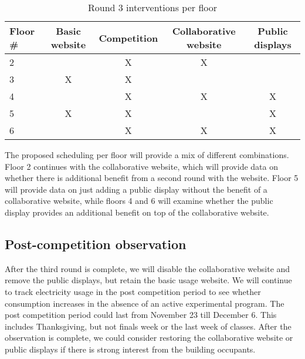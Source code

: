 \documentclass[11pt]{article}
\begin{document}
\begin{table}[htbp]
	\centering
		\begin{tabular}{| l || c | c | c | c |}
			\hline
			Floor \# & Basic website & Competition & Collaborative website & Public displays \tabularnewline \hline \hline
			
			2 &   & X & X & \tabularnewline \hline
			
			3 & X & X &  & \tabularnewline \hline

			4 &   & X & X & X \tabularnewline \hline

			5 & X & X &  & X \tabularnewline \hline
			
			6 &   & X & X & X \tabularnewline \hline
		\end{tabular}
	\caption{Round 3 interventions per floor}
	\label{tab:round3-per-floor}
\end{table}

The proposed scheduling per floor will provide a mix of different combinations. Floor 2 continues with the collaborative website, which will provide data on whether there is additional benefit from a second round with the website. Floor 5 will provide data on just adding a public display without the benefit of a collaborative website, while floors 4 and 6 will examine whether the public display provides an additional benefit on top of the collaborative website.

%

\subsection{Post-competition observation}

After the third round is complete, we will disable the collaborative website and remove the public displays, but retain the basic usage website. We will continue to track electricity usage in the post competition period to see whether consumption increases in the absence of an active experimental program. The post competition period could last from November 23 till December 6. This includes Thanksgiving, but not finals week or the last week of classes. After the observation is complete, we could consider restoring the collaborative website or public displays if there is strong interest from the building occupants.
\end{document}
